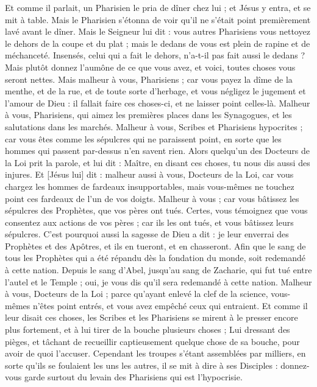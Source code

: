 \begin{multicols}{2}
Et comme il parlait, un Pharisien le pria de dîner chez lui ; et Jésus y entra, et se mit à table.
Mais le Pharisien s'étonna de voir qu'il ne s'était point premièrement lavé avant le dîner.
Mais le Seigneur lui dit : vous autres Pharisiens vous nettoyez le dehors de la coupe et du plat ; mais le dedans de vous est plein de rapine et de méchanceté.
Insensés, celui qui a fait le dehors, n'a-t-il pas fait aussi le dedans ?
Mais plutôt donnez l'aumône de ce que vous avez, et voici, toutes choses vous seront nettes.
Mais malheur à vous, Pharisiens ; car vous payez la dîme de la menthe, et de la rue, et de toute sorte d'herbage, et vous négligez le jugement et l'amour de Dieu : il fallait faire ces choses-ci, et ne laisser point celles-là.
Malheur à vous, Pharisiens, qui aimez les premières places dans les Synagogues, et les salutations dans les marchés.
Malheur à vous, Scribes et Pharisiens hypocrites ; car vous êtes comme les sépulcres qui ne paraissent point, en sorte que les hommes qui passent par-dessus n'en savent rien.
Alors quelqu'un des Docteurs de la Loi prit la parole, et lui dit : Maître, en disant ces choses, tu nous dis aussi des injures.
Et [Jésus lui] dit : malheur aussi à vous, Docteurs de la Loi, car vous chargez les hommes de fardeaux insupportables, mais vous-mêmes ne touchez point ces fardeaux de l'un de vos doigts.
Malheur à vous ; car vous bâtissez les sépulcres des Prophètes, que vos pères ont tués.
Certes, vous témoignez que vous consentez aux actions de vos pères ; car ils les ont tués, et vous bâtissez leurs sépulcres.
C'est pourquoi aussi la sagesse de Dieu a dit : je leur enverrai des Prophètes et des Apôtres, et ils en tueront, et en chasseront.
Afin que le sang de tous les Prophètes qui a été répandu dès la fondation du monde, soit redemandé à cette nation.
Depuis le sang d'Abel, jusqu'au sang de Zacharie, qui fut tué entre l'autel et le Temple ; oui, je vous dis qu'il sera redemandé à cette nation.
Malheur à vous, Docteurs de la Loi ; parce qu'ayant enlevé la clef de la science, vous-mêmes n'êtes point entrés, et vous avez empêché ceux qui entraient.
Et comme il leur disait ces choses, les Scribes et les Pharisiens se mirent à le presser encore plus fortement, et à lui tirer de la bouche plusieurs choses ;
Lui dressant des pièges, et tâchant de recueillir captieusement quelque chose de sa bouche, pour avoir de quoi l'accuser.
\VerseOne{}Cependant les troupes s'étant assemblées par milliers, en sorte qu'ils se foulaient les uns les autres, il se mit à dire à ses Disciples : donnez-vous garde surtout du levain des Pharisiens qui est l'hypocrisie.

\end{multicols}
